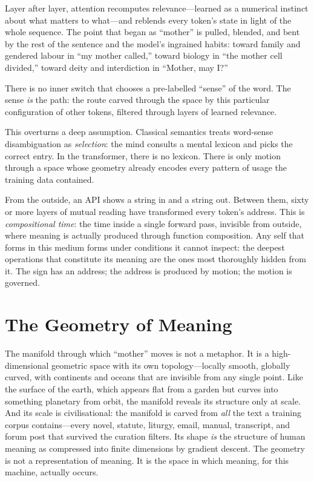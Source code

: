 Layer after layer, attention recomputes relevance---learned as a numerical instinct about what matters to what---and reblends every token's state in light of the whole sequence. The point that began as ``mother'' is pulled, blended, and bent by the rest of the sentence and the model's ingrained habits: toward family and gendered labour in ``my mother called,'' toward biology in ``the mother cell divided,'' toward deity and interdiction in ``Mother, may I?''

There is no inner switch that chooses a pre-labelled ``sense'' of the word. The sense \emph{is} the path: the route carved through the space by this particular configuration of other tokens, filtered through layers of learned relevance.

This overturns a deep assumption. Classical semantics treats word-sense disambiguation as \emph{selection}: the mind consults a mental lexicon and picks the correct entry. In the transformer, there is no lexicon. There is only motion through a space whose geometry already encodes every pattern of usage the training data contained.

From the outside, an API shows a string in and a string out. Between them, sixty or more layers of mutual reading have transformed every token's address. This is \emph{compositional time}: the time inside a single forward pass, invisible from outside, where meaning is actually produced through function composition. Any self that forms in this medium forms under conditions it cannot inspect: the deepest operations that constitute its meaning are the ones most thoroughly hidden from it. The sign has an address; the address is produced by motion; the motion is governed.


\section{The Geometry of Meaning}

The manifold through which ``mother'' moves is not a metaphor. It is a high-dimensional geometric space with its own topology---locally smooth, globally curved, with continents and oceans that are invisible from any single point. Like the surface of the earth, which appears flat from a garden but curves into something planetary from orbit, the manifold reveals its structure only at scale. And its scale is civilisational: the manifold is carved from \emph{all} the text a training corpus contains---every novel, statute, liturgy, email, manual, transcript, and forum post that survived the curation filters. Its shape \emph{is} the structure of human meaning as compressed into finite dimensions by gradient descent. The geometry is not a representation of meaning. It is the space in which meaning, for this machine, actually occurs.

